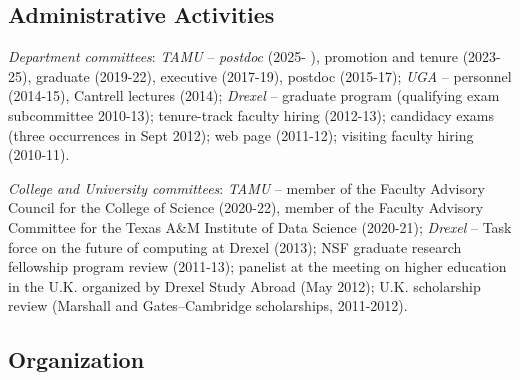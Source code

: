 \documentclass[11pt]{article}
\begin{document}
\subsection{Administrative Activities}
\bitemize
\item {\sl Department committees}:  
{\sl TAMU} -- {\sl postdoc} (2025- ), promotion and tenure (2023-25), 
graduate (2019-22), executive (2017-19), postdoc (2015-17);
{\sl UGA} -- personnel (2014-15), Cantrell lectures (2014); 
{\sl Drexel} -- 
graduate program (qualifying exam subcommittee 2010-13);
tenure-track faculty hiring (2012-13); 
candidacy exams (three occurrences in Sept 2012);
web page (2011-12);
visiting faculty hiring (2010-11).
\item {\sl College and University committees}: 
{\sl TAMU} -- 
member of the Faculty Advisory Council for the College of Science (2020-22),
member of the Faculty Advisory Committee for the Texas A\&M Institute of Data Science (2020-21);
{\sl Drexel} -- 
Task force on the future of computing at Drexel (2013);
NSF graduate research fellowship program review (2011-13);
panelist at the meeting on higher education in the U.K. organized by Drexel Study Abroad (May 2012); 
U.K. scholarship review  (Marshall and Gates--Cambridge scholarships, 2011-2012).
\eitemize 
 

\subsection{Organization}
\end{document}
